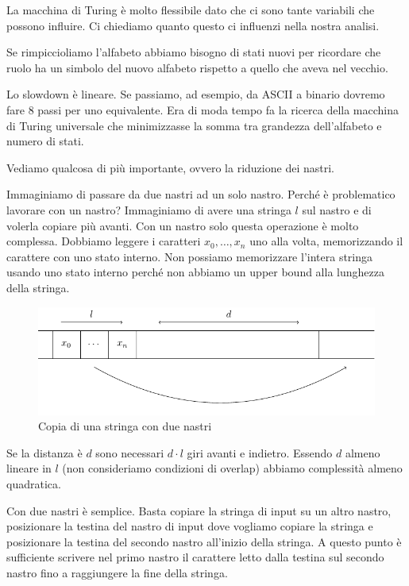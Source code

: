 La macchina di Turing è molto flessibile dato che ci sono tante variabili che possono influire. Ci
chiediamo quanto questo ci influenzi nella nostra analisi.

Se rimpiccioliamo l'alfabeto abbiamo bisogno di stati nuovi per ricordare che ruolo ha un simbolo del
nuovo alfabeto rispetto a quello che aveva nel vecchio.

Lo slowdown è lineare. Se passiamo, ad esempio, da ASCII a binario dovremo fare 8 passi per uno
equivalente. Era di moda tempo fa la ricerca della macchina di Turing universale che minimizzasse la
somma tra grandezza dell'alfabeto e numero di stati.

Vediamo qualcosa di più importante, ovvero la riduzione dei nastri.

Immaginiamo di passare da due nastri ad un solo nastro. Perché è problematico lavorare con un
nastro? Immaginiamo di avere una stringa $l$ sul nastro e di volerla copiare più avanti. Con un
nastro solo questa operazione è molto complessa. Dobbiamo leggere i caratteri $x_{0},\dotsc,x_{n}$
uno alla volta, memorizzando il carattere con uno stato interno. Non possiamo memorizzare l'intera
stringa usando uno stato interno perché non abbiamo un upper bound alla lunghezza della stringa.

\begin{figure}[h]
    \begin{center}
        \includegraphics{img/CopyString.pdf}
        \caption{Copia di una stringa con due nastri}
    \end{center}
\end{figure}

Se la distanza è $d$ sono necessari $d\cdot l$ giri avanti e indietro. Essendo $d$ almeno lineare in $l$
(non consideriamo condizioni di overlap) abbiamo complessità almeno quadratica.

Con due nastri è semplice. Basta copiare la stringa di input su un altro nastro, posizionare la
testina del nastro di input dove vogliamo copiare la stringa e posizionare la testina del secondo
nastro all'inizio della stringa. A questo punto è sufficiente scrivere nel primo nastro il
carattere letto dalla testina sul secondo nastro fino a raggiungere la fine della stringa.

